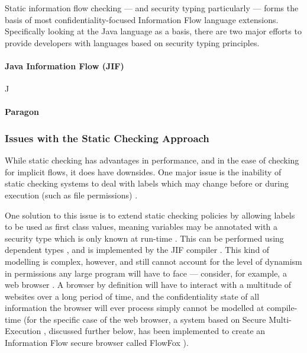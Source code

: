 Static information flow checking --- and security typing particularly --- forms the basis of most confidentiality-focused Information Flow language extensions. Specifically looking at the Java language as a basis, there are two major efforts to provide developers with languages based on security typing principles.

\paragraph{Java Information Flow (JIF)}

J

\cite{myers1999jif}

\cite{pullicino2014jif}

\cite{broberg2013paragon}

\paragraph{Paragon}

\subsubsection{Issues with the Static Checking Approach}

While static checking has advantages in performance, and in the ease of checking for implicit flows, it does have downsides. One major issue is the inability of static checking systems to deal with labels which may change before or during execution (such as file permissions) \cite{sabelfeld2003if}.

One solution to this issue is to extend static checking policies by allowing labels to be used as first class values, meaning variables may be annotated with a security type which is only known at run-time \cite{myers1997if}. This can be performed using dependent types \cite{xi1999dependenttypes}, and is implemented by the JIF compiler \cite{myers1999jif}. This kind of modelling is complex, however, and still cannot account for the level of dynamism in permissions any large program will have to face --- consider, for example, a web browser \cite{venkatakrishnan2006runtime}. A browser by definition will have to interact with a multitude of websites over a long period of time, and the confidentiality state of all information the browser will ever process simply cannot be modelled at compile-time (for the specific case of the web browser, a system based on Secure Multi-Execution \cite{devriese2010sme}, discussed further below, has been implemented to create an Information Flow secure browser called FlowFox \cite{degroef2012flowfox}).

